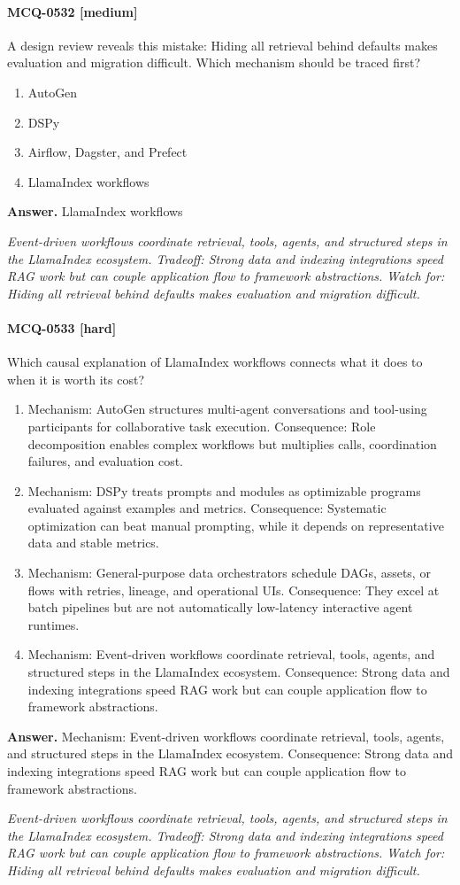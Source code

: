 \paragraph{MCQ-0532 [medium]} A design review reveals this mistake: Hiding all retrieval behind defaults makes evaluation and migration difficult. Which mechanism should be traced first?
\begin{enumerate}[label=\Alph*.]
\item AutoGen
\item DSPy
\item Airflow, Dagster, and Prefect
\item LlamaIndex workflows
\end{enumerate}
\noindent\textbf{Answer.} LlamaIndex workflows
\par\textit{Event-driven workflows coordinate retrieval, tools, agents, and structured steps in the LlamaIndex ecosystem. Tradeoff: Strong data and indexing integrations speed RAG work but can couple application flow to framework abstractions. Watch for: Hiding all retrieval behind defaults makes evaluation and migration difficult.}
\paragraph{MCQ-0533 [hard]} Which causal explanation of LlamaIndex workflows connects what it does to when it is worth its cost?
\begin{enumerate}[label=\Alph*.]
\item Mechanism: AutoGen structures multi-agent conversations and tool-using participants for collaborative task execution. Consequence: Role decomposition enables complex workflows but multiplies calls, coordination failures, and evaluation cost.
\item Mechanism: DSPy treats prompts and modules as optimizable programs evaluated against examples and metrics. Consequence: Systematic optimization can beat manual prompting, while it depends on representative data and stable metrics.
\item Mechanism: General-purpose data orchestrators schedule DAGs, assets, or flows with retries, lineage, and operational UIs. Consequence: They excel at batch pipelines but are not automatically low-latency interactive agent runtimes.
\item Mechanism: Event-driven workflows coordinate retrieval, tools, agents, and structured steps in the LlamaIndex ecosystem. Consequence: Strong data and indexing integrations speed RAG work but can couple application flow to framework abstractions.
\end{enumerate}
\noindent\textbf{Answer.} Mechanism: Event-driven workflows coordinate retrieval, tools, agents, and structured steps in the LlamaIndex ecosystem. Consequence: Strong data and indexing integrations speed RAG work but can couple application flow to framework abstractions.
\par\textit{Event-driven workflows coordinate retrieval, tools, agents, and structured steps in the LlamaIndex ecosystem. Tradeoff: Strong data and indexing integrations speed RAG work but can couple application flow to framework abstractions. Watch for: Hiding all retrieval behind defaults makes evaluation and migration difficult.}
